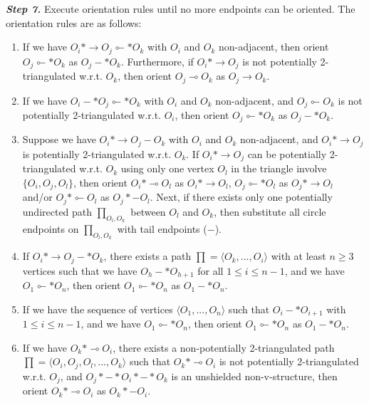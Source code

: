 \documentclass[twoside, 11pt]{article}
\begin{document}
\begin{appendices}
\begin{algorithm}
\begin{algorithmic}[1]
\State \textit{\textbf{Step 7.}}  \label{ccistep7} Execute orientation rules until no more endpoints can be oriented. The orientation rules are as follows:
\begin{enumerate}[nolistsep, label=(\roman*)] 
    \item If we have $O_i * \rightarrow O_j \multimapinv * O_k$ with $O_i$ and $O_k$ non-adjacent, then orient $O_j \multimapinv * O_k$ as $O_j - * O_k$. Furthermore, if $O_i *\rightarrow O_j$ is not potentially 2-triangulated w.r.t. $O_k$, then orient $O_j \multimap O_k$ as $O_j \rightarrow O_k$.

    \item If we have $O_i -* O_j \multimapinv* O_k$ with $O_i$ and $O_k$ non-adjacent, and $O_j \multimapinv O_k$ is not potentially 2-triangulated w.r.t. $O_i$, then orient $O_j \multimapinv* O_k$ as $O_j -* O_k$.

    \item Suppose we have $O_i * \rightarrow O_j - O_k$ with $O_i$ and $O_k$ non-adjacent, and $O_i * \rightarrow O_j$ is potentially 2-triangulated w.r.t. $O_k$. If $O_i * \rightarrow O_j$ can be potentially 2-triangulated w.r.t. $O_k$ using only one vertex $O_l$ in the triangle involve $\{O_i, O_j, O_l \}$, then orient $O_i * \multimap O_l$ as $O_i * \rightarrow O_l$, $O_j \multimapinv * O_l$ as $O_j * \rightarrow O_l$ and/or $O_j * \multimapinv O_l$ as $O_j *- O_l$. Next, if there exists only one potentially undirected path $\prod_{O_l, O_k}$ between $O_l$ and $O_k$, then substitute all circle endpoints on $\prod_{O_l, O_k}$ with tail endpoints ($-$).

    \item If $O_i * \rightarrow O_j -* O_k$, there exists a path $\prod = \langle O_k, ..., O_i \rangle$ with at least $n \ge 3$ vertices such that we have $O_h -* O_{h+1}$ for all $ 1 \le i \le n -1$, and we have $O_1 \multimapinv * O_n$, then orient $O_1 \multimapinv * O_n$ as $O_1 - * O_n$.

    \item If we have the sequence of vertices $\langle O_1, ..., O_n \rangle$ such that $O_i -* O_{i+1}$ with $1 \le i \le n-1$, and we have $O_1 \multimapinv* O_n$, then orient $O_1 \multimapinv * O_n$ as $O_1 -* O_n$.

    \item If we have $O_k * \multimap O_i$, there exists a non-potentially 2-triangulated path $\prod = \langle O_i, O_j, O_l, ..., O_k \rangle$ such that $O_k * \multimap O_i$ is not potentially 2-triangulated w.r.t. $O_j$, and $O_j *-* O_i *-* O_k$ is an unshielded non-v-structure, then orient $O_k * \multimap O_i$ as $O_k *- O_i$.


\end{enumerate}
\end{algorithmic}
\end{algorithm}
\end{appendices}
\end{document}
